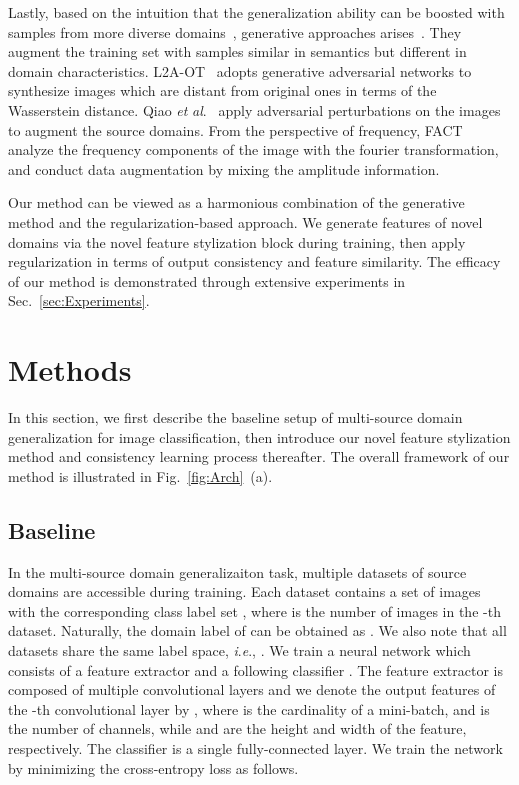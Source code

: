 \documentclass[sigconf]{acmart}
\newcommand{\ie}{\textit{i}.\textit{e}.}
\newcommand{\etal}{\textit{et} \textit{al}.}
\newcommand{\Fref}[1]{Fig.~\ref{#1}}
\begin{document}
Lastly, based on the intuition that the generalization ability can be boosted with samples from more diverse domains~\cite{tobin2017domain}, generative approaches arises~\cite{zhou2020learning, nuriel2020permuted, xu2020robust, qiao2020learning}. They augment the training set with samples similar in semantics but different in domain characteristics. L2A-OT~\cite{zhou2020learning} adopts generative adversarial networks to synthesize images which are distant from original ones in terms of the Wasserstein distance. Qiao \etal~\cite{qiao2020learning} apply adversarial perturbations on the images to augment the source domains. From the perspective of frequency, FACT~\cite{xu2021fourier} analyze the frequency components of the image with the fourier transformation, and conduct data augmentation by mixing the amplitude information.

Our method can be viewed as a harmonious combination of the generative method and the regularization-based approach. We generate features of novel domains via the novel feature stylization block during training, then apply regularization in terms of output consistency and feature similarity. The efficacy of our method is demonstrated through extensive experiments in Sec.~\ref{sec:Experiments}.

\section{Methods}

In this section, we first describe the baseline setup of multi-source domain generalization for image classification,  then introduce our novel feature stylization method and consistency learning process thereafter.
The overall framework of our method is illustrated in \Fref{fig:Arch}~(a).

\subsection{Baseline}
In the multi-source domain generalizaiton task, multiple datasets of  source domains  are accessible during training. Each dataset  contains a set of images  with the corresponding class label set , where  is the number of images in the -th dataset. Naturally, the domain label of  can be obtained as . We also note that all datasets share the same label space, \ie, .
We train a neural network  which consists of a feature extractor  and a following classifier . The feature extractor is composed of multiple convolutional layers and we denote the output features of the -th convolutional layer by , where  is the cardinality of a mini-batch, and  is the number of channels, while  and  are the height and width of the feature, respectively.
The classifier is a single fully-connected layer.
We train the network  by minimizing the cross-entropy loss as follows.
\end{document}
